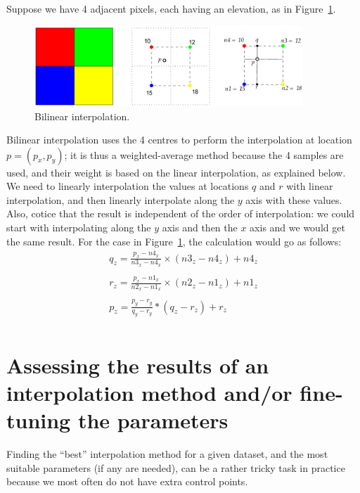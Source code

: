 Suppose we have 4 adjacent pixels, each having an elevation, as in Figure~\ref{fig:bilinear}.
\begin{figure}
  \centering
  \includegraphics[width=0.9\textwidth]{figs/bilinear}
  \caption{Bilinear interpolation.} 
\label{fig:bilinear}
\end{figure}
Bilinear interpolation uses the 4 centres to perform the interpolation at location $p = (p_x, p_y)$; it is thus a weighted-average method because the 4 samples are used, and their weight is based on the linear interpolation, as explained below.
We need to linearly interpolation the values at locations $q$ and $r$ with linear interpolation, and then linearly interpolate along the $y$ axis with these values. 
Also, cotice that the result is independent of the order of interpolation: we could start with interpolating along the $y$ axis and then the $x$ axis and we would get the same result. 
For the case in Figure~\ref{fig:bilinear}, the calculation would go as follows:
\[
  \begin{array}{l}
    q_z = \frac{p_x - n4_x}{n3_x - n4_x} \times (n3_z - n4_z) + n4_z \\
   \\
    r_z = \frac{p_x - n1_x}{n2_x - n1_x} \times (n2_z - n1_z) + n1_z \\
    \\
    p_z = \frac{p_y - r_y}{q_y - r_y} * (q_z - r_z) + r_z \\
  \end{array}
\]


%
\section{Assessing the results of an interpolation method and/or fine-tuning the parameters}

Finding the ``best'' interpolation method for a given dataset, and the most suitable parameters (if any are needed), can be a rather tricky task in practice because we most often do not have extra control points.

